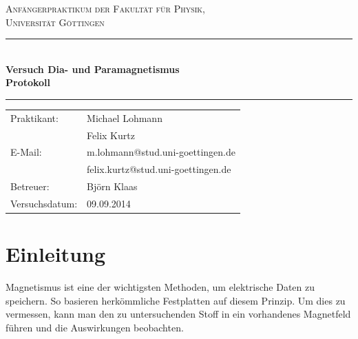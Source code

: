 \documentclass[12pt,a4paper,titlepage,headinclude,bibtotoc]{scrartcl}
\begin{document}
\begin{titlepage}
\centering
\textsc{\Large Anfängerpraktikum der Fakultät für
  Physik,\\[1.5ex] Universität Göttingen}

\vspace*{3.5cm}

\rule{\textwidth}{1pt}\\[0.5cm]
{\huge \bfseries
  Versuch Dia- und Paramagnetismus\\[1.5ex]
  Protokoll}\\[0.5cm]
\rule{\textwidth}{1pt}

\vspace*{3.5cm}

\begin{Large}
\begin{tabular}{ll}
Praktikant: &  Michael Lohmann\\
 &  Felix Kurtz\\
 E-Mail: & m.lohmann@stud.uni-goettingen.de\\
 &  felix.kurtz@stud.uni-goettingen.de\\
 Betreuer: & Björn Klaas \\
 Versuchsdatum: & 09.09.2014\\
\end{tabular}
\end{Large}

\vspace*{0.8cm}

\begin{Large}
\end{Large}

\end{titlepage}

\tableofcontents

\newpage

\section{Einleitung}
\label{sec:einleitung}
Magnetismus ist eine der wichtigsten Methoden, um elektrische Daten zu speichern.
So basieren herkömmliche Festplatten auf diesem Prinzip.
Um dies zu vermessen, kann man den zu untersuchenden Stoff in ein vorhandenes Magnetfeld führen und die Auswirkungen beobachten.
\end{document}
